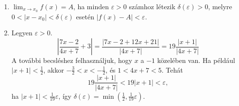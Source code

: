 \documentclass[11pt]{scrartcl}
\begin{document}
\begin{enumerate}
	\item $\lim_{x \to x_0} f(x) = A$, ha minden $\varepsilon > 0$ számhoz
	      létezik $\delta(\varepsilon) > 0$, melyre
	      $0 < |x - x_0| < \delta(\varepsilon)$ esetén
	      $|f(x) - A| < \varepsilon$.

	\item Legyen $\varepsilon > 0$.
	      \[
		      \left| \frac{7x - 2}{4x + 7} + 3 \right|
		      = \frac{|7x - 2 + 12x + 21|}{|4x + 7|}
		      = 19 \frac{|x + 1|}{|4x + 7|}
	      \]
	      A további becsléshez felhasználjuk, hogy $x$ a $-1$ közelében van. Ha
	      például $|x + 1| < \frac{1}{2}$, akkor $-\frac{3}{2} < x < -\frac{1}{2}$,
	      és $1 < 4x + 7 < 5$. Tehát
	      \[
		      19 \frac{|x + 1|}{|4x + 7|} < 19 |x + 1| < \varepsilon,
	      \]
	      ha $|x + 1| < \frac{1}{19} \varepsilon$, így
	      \(
	      \delta(\varepsilon)
	      = \min\left(\frac{1}{2}, \frac{1}{19} \varepsilon\right)
	      \).
\end{enumerate}
\end{document}
